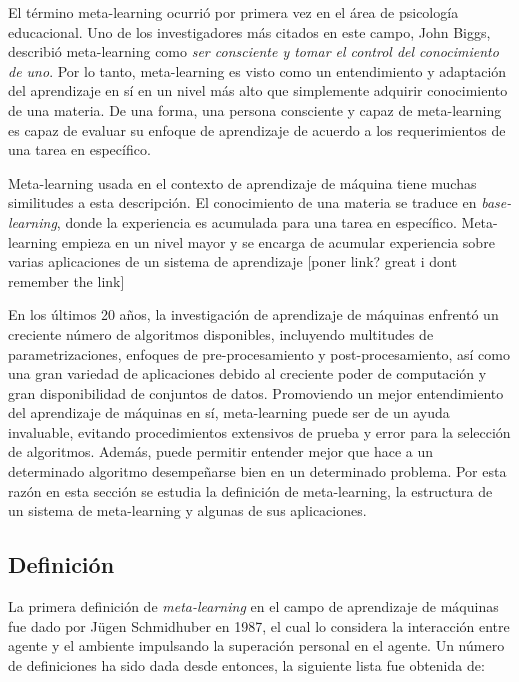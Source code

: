 El término meta-learning ocurrió por primera vez en el área de psicología educacional. Uno de los investigadores más citados en este campo, John Biggs, describió meta-learning como \textit{ser consciente y tomar el control del conocimiento de uno}. Por lo tanto, meta-learning es visto como un entendimiento y adaptación del aprendizaje en sí en un nivel más alto que simplemente adquirir conocimiento de una materia. De una forma, una persona consciente y capaz de meta-learning es capaz de evaluar su enfoque de aprendizaje de acuerdo a los requerimientos de una tarea en específico.

Meta-learning usada en el contexto de aprendizaje de máquina tiene muchas similitudes a esta descripción. El conocimiento de una materia se traduce en \textit{base-learning}, donde la experiencia es acumulada para una tarea en específico. Meta-learning empieza en un nivel mayor y se encarga de acumular experiencia sobre varias aplicaciones de un sistema de aprendizaje [poner link? great i dont remember the link]

En los últimos 20 años, la investigación de aprendizaje de máquinas enfrentó un creciente número de algoritmos disponibles, incluyendo multitudes de parametrizaciones, enfoques de pre-procesamiento y post-procesamiento, así como una gran variedad de aplicaciones debido al creciente poder de computación y gran disponibilidad de conjuntos de datos. Promoviendo un mejor entendimiento del aprendizaje de máquinas en sí, meta-learning puede ser de un ayuda invaluable, evitando procedimientos extensivos de prueba y error para la selección de algoritmos. Además, puede permitir entender mejor que hace a un determinado algoritmo desempeñarse bien en un determinado problema. Por esta razón en esta sección se estudia la definición de meta-learning, la estructura de un sistema de meta-learning y algunas de sus aplicaciones.

\subsection{Definición}\label{subsec:mtl-definition}


La primera definición de \textit{meta-learning} en el campo de aprendizaje de máquinas fue dado por J\"ugen Schmidhuber en 1987, el cual lo considera la interacción entre agente y el ambiente impulsando la superación personal en el agente. Un número de definiciones ha sido dada desde entonces, la siguiente lista fue obtenida de:

